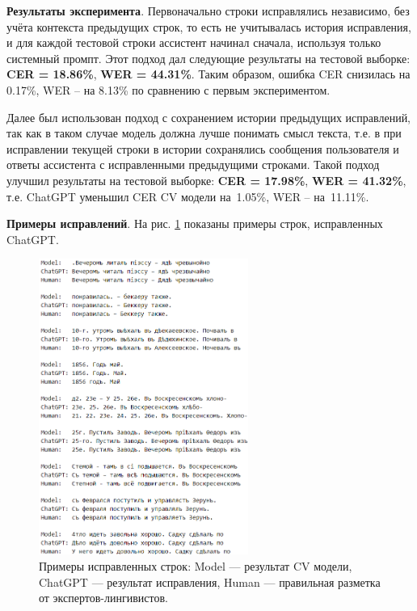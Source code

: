 \documentclass{extarticle}
\begin{document}
\textbf{Результаты эксперимента}. Первоначально строки исправлялись независимо, без учёта контекста предыдущих строк, то есть не учитывалась история исправления, и для каждой тестовой строки ассистент начинал сначала, используя только системный промпт. Этот подход дал следующие результаты на тестовой выборке: \textbf{CER = 18.86\%}, \textbf{WER = 44.31\%}. Таким образом, ошибка CER снизилась на 0.17\%, WER -- на 8.13\% по сравнению с первым экспериментом.

Далее был использован подход с сохранением истории предыдущих исправлений, так как в таком случае модель должна лучше понимать смысл текста, т.е. в при исправлении текущей строки в истории сохранялись сообщения пользователя и ответы ассистента с исправленными предыдущими строками. Такой подход улучшил результаты на тестовой выборке: \textbf{CER = 17.98\%}, \textbf{WER = 41.32\%}, т.е. ChatGPT уменьшил CER CV модели на 1.05\%, WER -- на 11.11\%.

\textbf{Примеры исправлений}. На рис. \ref{fig:gpt_example} показаны примеры строк, исправленных ChatGPT.

\begin{figure}[H]
	\centering
	\includegraphics[width=0.61\textwidth]{images/gpt_example.png}
	\caption{Примеры исправленных строк: Model — результат CV модели, ChatGPT — результат исправления, Human — правильная разметка от экспертов-лингивистов.}
	\label{fig:gpt_example}
\end{figure}
\end{document}
